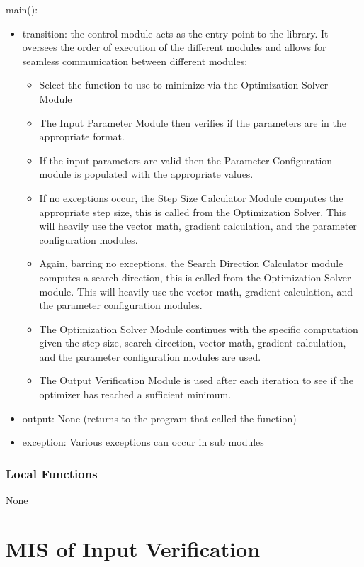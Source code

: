 \documentclass[12pt, titlepage]{article}
\begin{document}
\noindent main():
\begin{itemize}
\item transition: the control module acts as the entry point to the library. It oversees the order of execution of the different modules and allows for seamless communication between different modules:
\begin{itemize}
    \item Select the function to use to minimize via the Optimization Solver Module
    \item The Input Parameter Module then verifies if the parameters are in the appropriate format.
    \item If the input parameters are valid then the Parameter Configuration module is populated with the appropriate values.
    \item If no exceptions occur, the Step Size Calculator Module computes the appropriate step size, this is called from the Optimization Solver. This will heavily use the vector math, gradient calculation, and the parameter configuration modules.
    \item Again, barring no exceptions, the Search Direction Calculator module computes a search direction, this is called from the Optimization Solver module. This will heavily use the vector math, gradient calculation, and the parameter configuration modules.
    \item The Optimization Solver Module continues with the specific computation given the step size, search direction, vector math, gradient calculation, and the parameter configuration modules are used.
    \item The Output Verification Module is used after each iteration to see if the optimizer has reached a sufficient minimum. 
\end{itemize}
\item output: None (returns to the program that called the function)
\item exception: Various exceptions can occur in sub modules
\end{itemize}


\subsubsection{Local Functions}

None

\section{MIS of Input Verification}\label{Module:InputVerify}
\end{document}
